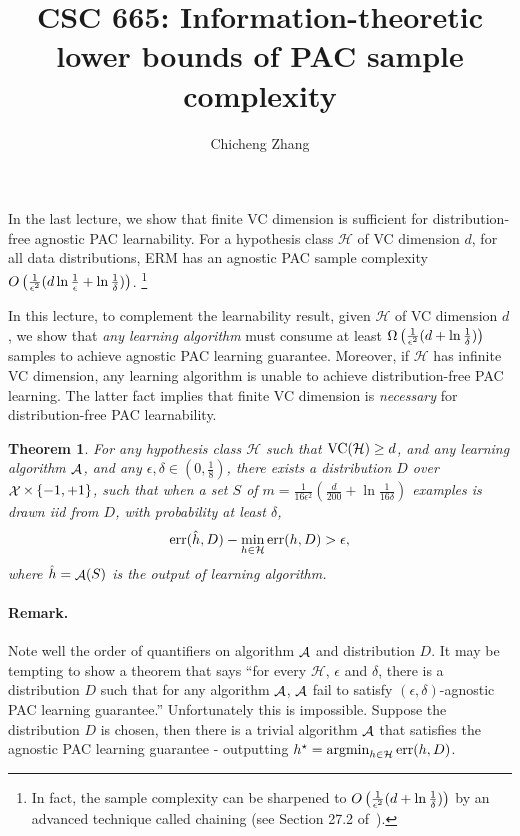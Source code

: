 \documentclass{article}
\title{CSC 665: Information-theoretic lower bounds of PAC sample complexity}
\author{Chicheng Zhang}
\newtheorem{theorem}{Theorem}
\DeclareMathOperator*{\err}{{\rm err}}
\DeclareMathOperator*{\Xcal}{{\cal X}}
\DeclareMathOperator*{\Acal}{{\cal A}}
\DeclareMathOperator*{\argmin}{{\rm argmin}}
\DeclareMathOperator*{\VC}{{\rm VC}}
\newcommand{\Hcal}{\mathcal{H}}
\begin{document}
\maketitle

In the last lecture, we show that finite VC dimension is
sufficient for distribution-free agnostic PAC learnability.
For a hypothesis class $\Hcal$
of VC dimension $d$, for all data distributions,
ERM has an agnostic PAC sample complexity
$O\del{\frac{1}{\epsilon^2}(d \ln\frac1\epsilon + \ln\frac1\delta)}$.
\footnote{In fact, the sample complexity can be sharpened to
$O\del{\frac{1}{\epsilon^2}(d + \ln\frac1\delta)}$ by an
advanced technique called chaining (see Section 27.2
of~\cite{shalev2014understanding}).}

In this lecture, to complement the learnability result, given $\Hcal$
of VC dimension $d$,
we show that {\em any learning algorithm} must consume at least
$\Omega\del{\frac{1}{\epsilon^2}(d + \ln\frac1\delta)}$ samples to achieve agnostic
PAC learning guarantee. Moreover, if $\Hcal$ has infinite VC dimension,
any learning algorithm is unable to achieve distribution-free PAC learning.
The latter fact implies that finite VC dimension is {\em necessary} for
distribution-free PAC learnability.

\begin{theorem}
For any hypothesis class $\Hcal$ such that $\VC(\Hcal)\geq d$,
and any learning algorithm $\Acal$, and any $\epsilon,\delta \in (0,\frac18)$,
there exists a distribution $D$ over $\Xcal \times \cbr{-1,+1}$, such that
when a set $S$ of $m = \frac{1}{16\epsilon^2}(\frac{d}{200} + \ln\frac1{16\delta})$ examples is drawn iid from
$D$, with probability at least $\delta$,
\[ \err(\hat{h}, D) - \min_{h \in \Hcal} \err(h, D) > \epsilon, \]
where $\hat{h} = \Acal(S)$ is the output of learning algorithm.
\label{thm:lb}
\end{theorem}

\paragraph{Remark.} Note well the order of quantifiers on algorithm $\Acal$ and distribution $D$. It may be tempting to show a theorem that says ``for every $\Hcal$, $\epsilon$ and $\delta$, there is a distribution $D$ such that for any algorithm $\Acal$, $\Acal$ fail to satisfy $(\epsilon,\delta)$-agnostic PAC learning guarantee.'' Unfortunately this is impossible. Suppose the distribution $D$ is chosen, then there is a trivial algorithm $\Acal$ that satisfies the agnostic PAC learning guarantee - outputting $h^\star = \argmin_{h \in \Hcal} \err(h,D)$.
\end{document}
